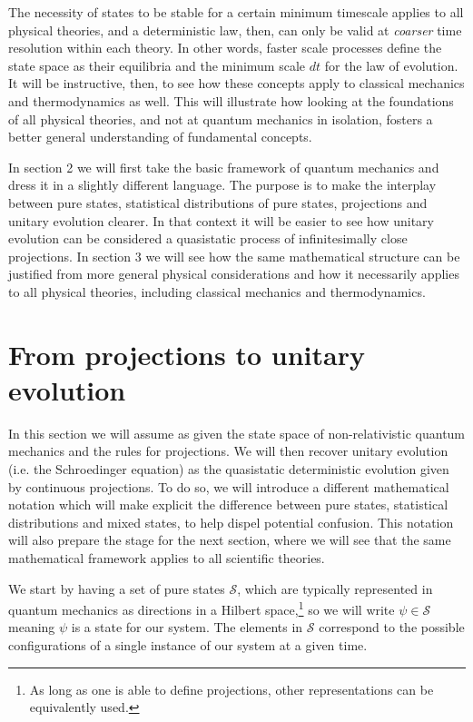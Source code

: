 \documentclass[applsci,article,submit,moreauthors,pdftex]{Definitions/mdpi}
\begin{document}
The necessity of states to be stable for a certain minimum timescale applies to all physical theories, and a deterministic law, then, can only be valid at \emph{coarser} time resolution within each theory. In other words, faster scale processes define the state space as their equilibria and the minimum scale $dt$ for the law of evolution. It will be instructive, then, to see how these concepts apply to classical mechanics and thermodynamics as well. This will illustrate how looking at the foundations of all physical theories, and not at quantum mechanics in isolation, fosters a better general understanding of fundamental concepts.

In section 2 we will first take the basic framework of quantum mechanics and dress it in a slightly different language. The purpose is to make the interplay between pure states, statistical distributions of pure states, projections and unitary evolution clearer. In that context it will be easier to see how unitary evolution can be considered a quasistatic process of infinitesimally close projections. In section 3 we will see how the same mathematical structure can be justified from more general physical considerations and how it necessarily applies to all physical theories, including classical mechanics and thermodynamics. 

\section{From projections to unitary evolution}

In this section we will assume as given the state space of non-relativistic quantum mechanics and the rules for projections. We will then recover unitary evolution (i.e. the Schroedinger equation) as the quasistatic deterministic evolution given by continuous projections. To do so, we will introduce a different mathematical notation which will make explicit the difference between pure states, statistical distributions and mixed states, to help dispel potential confusion. This notation will also prepare the stage for the next section, where we will see that the same mathematical framework applies to all scientific theories.

We start by having a set of pure states $\mathcal{S}$, which are typically represented in quantum mechanics as directions in a Hilbert space,\footnote{As long as one is able to define projections, other representations can be equivalently used.} so we will write $\psi \in \mathcal{S}$ meaning $\psi$ is a state for our system. The elements in $\mathcal{S}$ correspond to the possible configurations of a single instance of our system at a given time.
\end{document}
